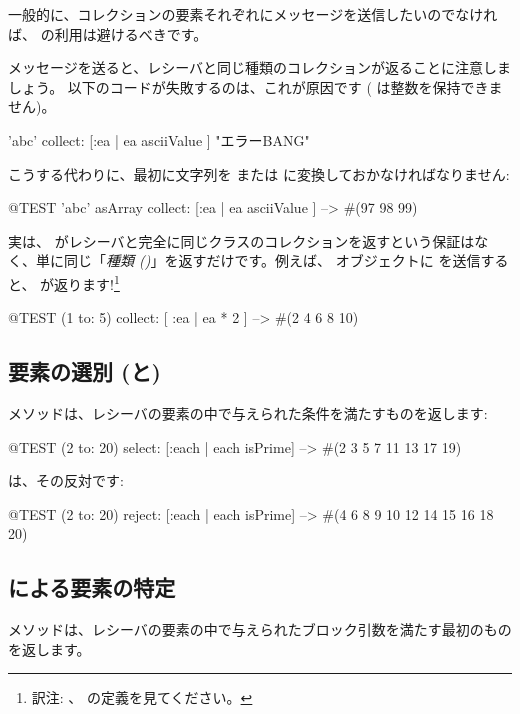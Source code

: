 \documentclass[a4paper,10pt,twoside]{book}
\begin{document}
一般的に、コレクションの要素それぞれにメッセージを送信したいのでなければ、 の利用は避けるべきです。

 メッセージを送ると、レシーバと同じ種類のコレクションが返ることに注意しましょう。
以下のコードが失敗するのは、これが原因です
( は整数を保持できません)。
\begin{code}{}
'abc' collect: [:ea | ea asciiValue ]      "エラーBANG"
\end{code}
\noindent
こうする代わりに、最初に文字列を  または  に変換しておかなければなりません:
\begin{code}{@TEST}
'abc' asArray collect: [:ea | ea asciiValue ] --> #(97 98 99)
\end{code}

実は、 がレシーバと完全に同じクラスのコレクションを返すという保証はなく、単に同じ「\emph{種類 ()}」を返すだけです。例えば、 オブジェクトに  を送信すると、 が返ります!\footnote{訳注: 、 の定義を見てください。}
\begin{code}{@TEST}
(1 to: 5) collect: [ :ea | ea * 2 ] --> #(2 4 6 8 10)
\end{code}

\subsection{要素の選別 (と)}

 メソッドは、レシーバの要素の中で与えられた条件を満たすものを返します:

\begin{code}{@TEST}
(2 to: 20) select: [:each | each isPrime] --> #(2 3 5 7 11 13 17 19)
\end{code}

 は、その反対です:
\begin{code}{@TEST}
(2 to: 20) reject: [:each | each isPrime] --> #(4 6 8 9 10 12 14 15 16 18 20)
\end{code}

\subsection{ による要素の特定}
 メソッドは、レシーバの要素の中で与えられたブロック引数を満たす最初のものを返します。
\end{document}

